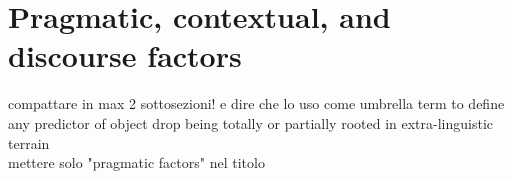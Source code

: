 \section{Pragmatic, contextual, and discourse factors} 

compattare in max 2 sottosezioni! e dire che lo uso come umbrella term to define any predictor of object drop being totally or partially rooted in extra-linguistic terrain\\

mettere solo "pragmatic factors" nel titolo








